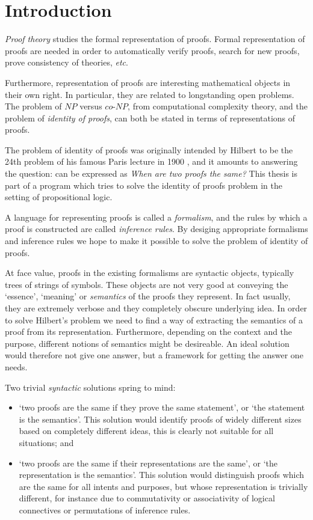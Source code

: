 \chapter{Introduction}

\emph{Proof theory} studies the formal representation of proofs. Formal representation of proofs are needed in order to automatically verify proofs, search for new proofs, prove consistency of theories, \emph{etc}.

Furthermore, representation of proofs are interesting mathematical objects in their own right. In particular, they are related to longstanding open problems. The problem of $NP$ versus $co$-$NP$, from computational complexity theory, and the problem of \emph{identity of proofs}, can both be stated in terms of representations of proofs.

The problem of identity of proofs was originally intended by Hilbert to be the 24th problem of his famous Paris lecture in 1900 \cite{Thie:03:Hilberts:yu}, and it amounts to answering the question: can be expressed as \emph{When are two proofs the same?} This thesis is part of a program which tries to solve the identity of proofs problem in the setting of propositional logic.

A language for representing proofs is called a \emph{formalism}, and the rules by which a proof is constructed are called \emph{inference rules}. By desiging appropriate formalisms and inference rules we hope to make it possible to solve the problem of identity of proofs.

At face value, proofs in the existing formalisms are syntactic objects, typically trees of strings of symbols. These objects are not very good at conveying the `essence', `meaning' or \emph{semantics} of the proofs they represent. In fact usually, they are extremely verbose and they completely obscure underlying idea. In order to solve Hilbert's problem we need to find a way of extracting the semantics of a proof from its representation. Furthermore, depending on the context and the purpose, different notions of semantics might be desireable. An ideal solution would therefore not give one answer, but a framework for getting the answer one needs.

Two trivial \emph{syntactic} solutions spring to mind:
\begin{itemize}
 \item `two proofs are the same if they prove the same statement', or `the statement is the semantics'. This solution would identify proofs of widely different sizes based on completely different ideas, this is clearly not suitable for all situations; and
 \item `two proofs are the same if their representations are the same', or `the representation is the semantics'. This solution would distinguish proofs which are the same for all intents and purposes, but whose representation is trivially different, for instance due to commutativity or associativity of logical connectives or permutations of inference rules.
\end{itemize}

